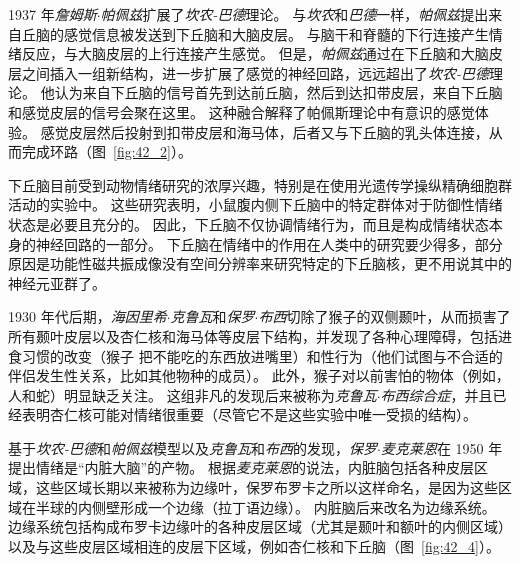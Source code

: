 1937 年\textit{詹姆斯$\cdot$帕佩兹}扩展了\textit{坎农-巴德}理论。
与\textit{坎农}和\textit{巴德}一样，\textit{帕佩兹}提出来自丘脑的感觉信息被发送到下丘脑和大脑皮层。
与脑干和脊髓的下行连接产生情绪反应，与大脑皮层的上行连接产生感觉。
但是，\textit{帕佩兹}通过在下丘脑和大脑皮层之间插入一组新结构，进一步扩展了感觉的神经回路，远远超出了\textit{坎农-巴德}理论。
他认为来自下丘脑的信号首先到达前丘脑，然后到达扣带皮层，来自下丘脑和感觉皮层的信号会聚在这里。
这种融合解释了帕佩斯理论中有意识的感觉体验。
感觉皮层然后投射到扣带皮层和海马体，后者又与下丘脑的乳头体连接，从而完成环路（图~\ref{fig:42_2}）。


下丘脑目前受到动物情绪研究的浓厚兴趣，特别是在使用光遗传学操纵精确细胞群活动的实验中。
这些研究表明，小鼠腹内侧下丘脑中的特定群体对于防御性情绪状态是必要且充分的。
因此，下丘脑不仅协调情绪行为，而且是构成情绪状态本身的神经回路的一部分。
下丘脑在情绪中的作用在人类中的研究要少得多，部分原因是功能性磁共振成像没有空间分辨率来研究特定的下丘脑核，更不用说其中的神经元亚群了。


1930 年代后期，\textit{海因里希$\cdot$克鲁瓦}和\textit{保罗$\cdot$布西}切除了猴子的双侧颞叶，从而损害了所有颞叶皮层以及杏仁核和海马体等皮层下结构，并发现了各种心理障碍，包括进食习惯的改变（猴子 把不能吃的东西放进嘴里）和性行为（他们试图与不合适的伴侣发生性关系，比如其他物种的成员）。
此外，猴子对以前害怕的物体（例如，人和蛇）明显缺乏关注。
这组非凡的发现后来被称为\textit{克鲁瓦$\cdot$布西综合症}，并且已经表明杏仁核可能对情绪很重要（尽管它不是这些实验中唯一受损的结构）。


基于\textit{坎农-巴德}和\textit{帕佩兹}模型以及\textit{克鲁瓦}和\textit{布西}的发现，\textit{保罗$\cdot$麦克莱恩}在 1950 年提出情绪是“内脏大脑”的产物。
根据\textit{麦克莱恩}的说法，内脏脑包括各种皮层区域，这些区域长期以来被称为边缘叶，保罗布罗卡之所以这样命名，是因为这些区域在半球的内侧壁形成一个边缘（拉丁语边缘）。
内脏脑后来改名为边缘系统。
边缘系统包括构成布罗卡边缘叶的各种皮层区域（尤其是颞叶和额叶的内侧区域）以及与这些皮层区域相连的皮层下区域，例如杏仁核和下丘脑（图~\ref{fig:42_4}）。


